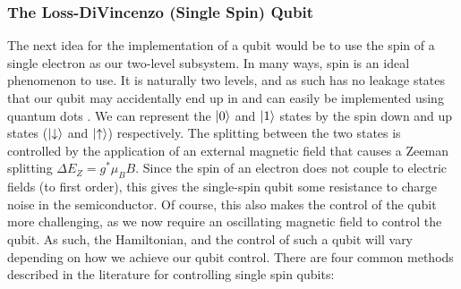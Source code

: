 \subsubsection{The Loss-DiVincenzo (Single Spin) Qubit}
The next idea for the implementation of a qubit would be to use the spin of a single electron as our two-level subsystem. In
many ways, spin is an ideal phenomenon to use. It is naturally two levels, and as such has no leakage states that our qubit
may accidentally end up in and can easily be implemented using quantum dots \cite{PhysRevA.57.120}. We can represent the $\ket{0}$ and $\ket{1}$ states
by the spin down and up states ($\ket{\downarrow}$ and $\ket{\uparrow}$) respectively. The splitting between the two states
is controlled by the application of an external magnetic field that causes a Zeeman splitting $\Delta E_Z = g^* \mu_B B$. Since the
spin of an electron does not couple to electric fields (to first order), this gives the single-spin qubit some resistance to
charge noise in the semiconductor. Of course, this also makes the control of the qubit more challenging, as we now require
an oscillating magnetic field to control the qubit. As such, the Hamiltonian, and the control of such a qubit will vary depending on
how we achieve our qubit control. There are four common methods described in the literature for controlling
single spin qubits:
